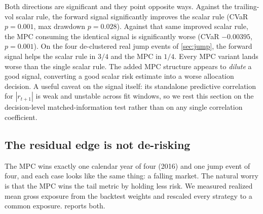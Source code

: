 \documentclass[journal]{IEEEtran}
\begin{document}
Both directions are significant and they point opposite ways. Against the
trailing-vol scalar rule, the forward signal significantly improves the scalar rule
(CVaR $p=0.001$, max drawdown $p=0.028$). Against that same improved scalar rule,
the MPC consuming the identical signal is significantly worse (CVaR
$-0.00395$, $p=0.001$). On the four de-clustered real jump events of
\cref{sec:jump}, the forward signal helps the scalar rule in $3/4$ and the MPC in
$1/4$. Every MPC variant lands worse than the single scalar rule. The added MPC
structure appears to \emph{dilute} a good signal, converting a good scalar risk
estimate into a worse allocation decision. A useful caveat on the signal itself:
its standalone predictive correlation for $|r_{t+1}|$ is weak and unstable across
fit windows, so we rest this section on the decision-level matched-information
test rather than on any single correlation coefficient.

\subsection{The residual edge is not de-risking}
\label{sec:exposure}

The MPC wins exactly one calendar year of four (2016) and one jump event of four,
and each case looks like the same thing: a falling market. The natural worry is
that the MPC wins the tail metric by holding less risk. We measured realized mean
gross exposure from the backtest weights and rescaled every strategy to a common
exposure.  reports both.
\end{document}
